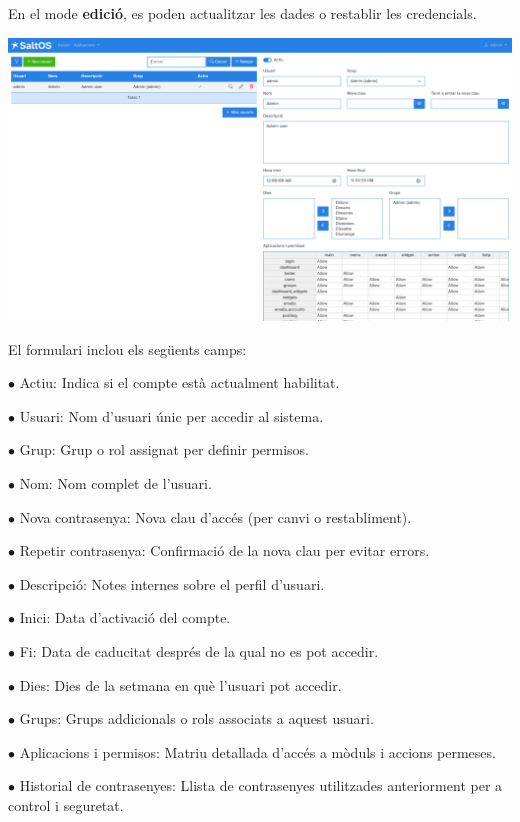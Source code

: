 \documentclass[a4paper]{article}
\begin{document}
En el mode \textbf{edició}, es poden actualitzar les dades o restablir les credencials.

\begin{center}\includegraphics[width=1\textwidth]{../ujest/snaps/test-screenshots-js-screenshots-users-users-edit-1-ca-es-1-snap.png}\end{center}

El formulari inclou els següents camps:

\begin{compactitem}
\item[\color{myblue}$\bullet$] Actiu: Indica si el compte està actualment habilitat.
\item[\color{myblue}$\bullet$] Usuari: Nom d'usuari únic per accedir al sistema.
\item[\color{myblue}$\bullet$] Grup: Grup o rol assignat per definir permisos.
\item[\color{myblue}$\bullet$] Nom: Nom complet de l'usuari.
\item[\color{myblue}$\bullet$] Nova contrasenya: Nova clau d'accés (per canvi o restabliment).
\item[\color{myblue}$\bullet$] Repetir contrasenya: Confirmació de la nova clau per evitar errors.
\item[\color{myblue}$\bullet$] Descripció: Notes internes sobre el perfil d'usuari.
\item[\color{myblue}$\bullet$] Inici: Data d'activació del compte.
\item[\color{myblue}$\bullet$] Fi: Data de caducitat després de la qual no es pot accedir.
\item[\color{myblue}$\bullet$] Dies: Dies de la setmana en què l'usuari pot accedir.
\item[\color{myblue}$\bullet$] Grups: Grups addicionals o rols associats a aquest usuari.
\item[\color{myblue}$\bullet$] Aplicacions i permisos: Matriu detallada d'accés a mòduls i accions permeses.
\item[\color{myblue}$\bullet$] Historial de contrasenyes: Llista de contrasenyes utilitzades anteriorment per a control i seguretat.
\end{compactitem}
\end{document}
